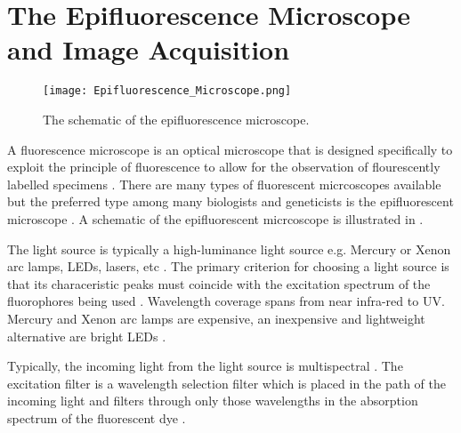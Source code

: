 
\section{The Epifluorescence Microscope and Image Acquisition}
\label{sec:TheEpifluorescenceMicroscope}

\begin{figure}[!t]
	\centering
	\texttt{[image: Epifluorescence\_Microscope.png]}
	\caption{The schematic of the epifluorescence microscope.}
	\label{fig:epifluorescencemicroscope}
\end{figure}

A fluorescence microscope is an optical microscope that is designed specifically to exploit the principle of fluorescence to allow for the observation of flourescently labelled specimens \citep{Hubeny2008,Sarder2006,Dobrucki2013,Andrews2002,Fatima2008}.
There are many types of fluorescent micrcoscopes available but the preferred type among many biologists and geneticists is the epifluorescent microscope \citep{Rice2016,AbramowitzDavidson2016}.
A schematic of the epifluorescent micrcoscope is illustrated in .

\begin{definition}
	The light source is typically a high-luminance light source e.g. Mercury or Xenon arc lamps, LEDs, lasers, etc  \citep{Danek2012,Hubeny2008,Aswani2012,Rice2016,ThermoFisher2016}.
	The primary criterion for choosing a light source is that its characeristic peaks must coincide with the excitation spectrum of the fluorophores being used \citep{LichtmanConchello2005,Spring2003,Fatima2008}.
	Wavelength coverage spans from near infra-red to UV.
	Mercury and Xenon arc lamps are expensive, an inexpensive and lightweight alternative are bright LEDs \citep{Fatima2008,Dobrucki2013,Aswani2012,Koch1972}.
\end{definition}

\begin{definition}
	Typically, the incoming light from the light source is multispectral \citep{SpringDavisdson2016}. 
	The excitation filter is a wavelength selection filter which is placed in the path of the incoming light and filters through only those wavelengths in the absorption spectrum of the fluorescent dye \citep{ThermoFisher2016,Danek2012,Hubeny2008,LichtmanConchello2005,Spring2003,CudeBurke2014,Fatima2008,Dobrucki2013}.
\end{definition}

